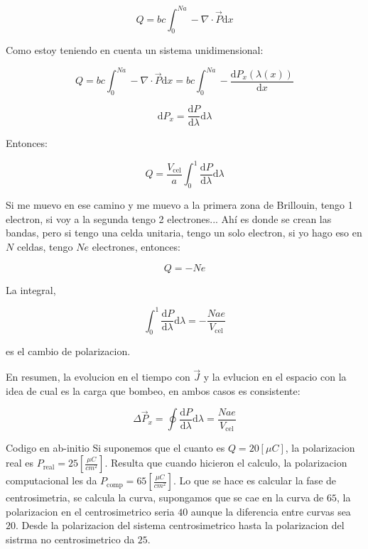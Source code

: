 \documentclass[11pt,fleqn]{book}
\begin{document}
\begin{equation}
    Q=bc\int_{0}^{Na}-\nabla\cdot\vec{P}\mathrm{d}x
\end{equation}

Como estoy teniendo en cuenta un sistema unidimensional:

\begin{equation}
    Q=bc\int_{0}^{Na}-\nabla\cdot\vec{P}\mathrm{d}x=bc\int_{0}^{Na}-\frac{\mathrm{d}P_{x}(\lambda(x))}{\mathrm{d}x}
\end{equation}

\begin{equation}
    \mathrm{d}P_{x}=\frac{\mathrm{d}P}{\mathrm{d}\lambda}\mathrm{d}\lambda
\end{equation}  

Entonces:

\begin{equation}
    Q=\frac{V_{\text{cel}}}{a}\int_{0}^{1}\frac{\mathrm{d}P}{\mathrm{d}\lambda}\mathrm{d}\lambda
\end{equation}


Si me muevo en ese camino  y me muevo a la primera zona de Brillouin, tengo 1 electron, si voy a la segunda tengo 2 electrones... Ahí es donde se crean las bandas, pero si tengo una celda unitaria, tengo un solo electron, si yo hago eso en $N$ celdas, tengo $Ne$ electrones, entonces:

\begin{equation}
    Q=-Ne
\end{equation}

La integral,

\begin{equation}
    \int_{0}^{1}\frac{\mathrm{d}P}{\mathrm{d}\lambda}\mathrm{d}\lambda=-\frac{Nae}{V_{\text{cel}}}
\end{equation}

es el cambio de polarizacion. 

En resumen, la evolucion en el tiempo con $\vec{J}$ y la evlucion en el espacio con la idea de cual es la carga que bombeo, en ambos casos es consistente:

\begin{equation}
    \Delta\vec{P}_{x}=\oint\frac{\mathrm{d}P}{\mathrm{d}\lambda}\mathrm{d}\lambda=\frac{Nae}{V_{\text{cel}}}
\end{equation}


\begin{example}{Codigo en ab-initio}
Si suponemos que el cuanto es $Q=20[\mu C]$, la polarizacion real es $P_{\text{real}}=25[\frac{\mu C}{cm^{2}}]$. Resulta que cuando hicieron el calculo, la polarizacion computacional les da $P_{\text{comp}}=65[\frac{\mu C}{cm^{2}}]$. Lo que se hace es calcular la fase de centrosimetria, se calcula la curva, supongamos que se cae en la curva de $65$, la polarizacion en el centrosimetrico seria $40$ aunque la diferencia entre curvas sea $20$. Desde la polarizacion del sistema centrosimetrico hasta la polarizacion del sistrma no centrosimetrico da $25$.

\end{example}
\end{document}
